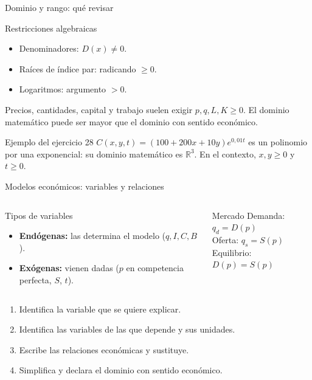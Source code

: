 \documentclass[aspectratio=169]{beamer}
\begin{document}
\begin{frame}{Dominio y rango: qué revisar}
  \begin{block}{Restricciones algebraicas}
    \begin{itemize}
      \item Denominadores: \(D(x)\neq 0\).
      \item Raíces de índice par: radicando \(\ge 0\).
      \item Logaritmos: argumento \(>0\).
    \end{itemize}
  \end{block}
  \begin{mwextra}
    Precios, cantidades, capital y trabajo suelen exigir \(p,q,L,K\ge 0\).
    El dominio matemático puede ser mayor que el dominio con sentido económico.
  \end{mwextra}
  \begin{exampleblock}{Ejemplo del ejercicio 28}
    \(C(x,y,t)=(100+200x+10y)e^{0{,}01t}\) es un polinomio por una exponencial:
    su dominio matemático es \(\mathbb{R}^{3}\). En el contexto, \(x,y\ge 0\)
    y \(t\ge 0\).
  \end{exampleblock}
\end{frame}

\begin{frame}{Modelos económicos: variables y relaciones}
  \begin{columns}[T]
    \begin{block}{Tipos de variables}
      \begin{itemize}
        \item \textbf{Endógenas:} las determina el modelo
              (\(q,I,C,B\)).
        \item \textbf{Exógenas:} vienen dadas
              (\(p\) en competencia perfecta, \(S\), \(t\)).
      \end{itemize}
    \end{block}
    \begin{block}{Mercado}
      Demanda: \(q_d=D(p)\)\\[2pt]
      Oferta: \(q_s=S(p)\)\\[2pt]
      Equilibrio: \(D(p)=S(p)\)
    \end{block}
  \end{columns}
  \vspace{2pt}
  \begin{mwpasos}
    \begin{enumerate}
      \item Identifica la variable que se quiere explicar.
      \item Identifica las variables de las que depende y sus unidades.
      \item Escribe las relaciones económicas y sustituye.
      \item Simplifica y declara el dominio con sentido económico.
    \end{enumerate}
  \end{mwpasos}
\end{frame}
\end{document}
